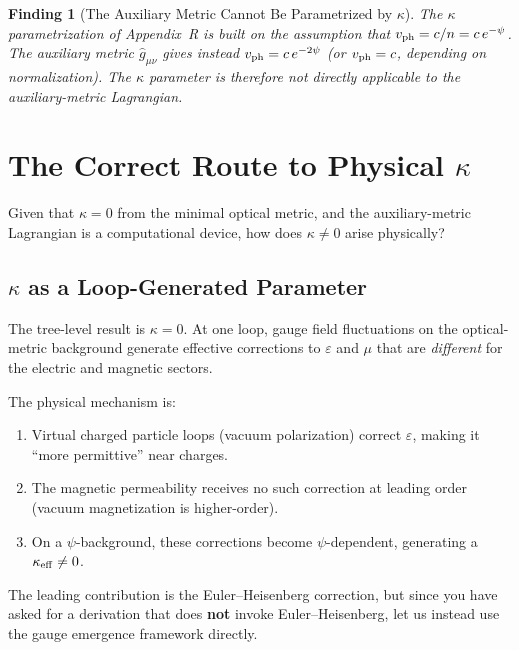 \documentclass[11pt,a4paper]{article}
\newtheorem{finding}{Finding}
\theoremstyle{definition}
\theoremstyle{remark}
\begin{document}
\begin{finding}[The Auxiliary Metric Cannot Be Parametrized by $\kappa$]
The $\kappa$ parametrization of Appendix~R is built on the assumption
that $v_{\rm ph} = c/n = c\,e^{-\psi}$.  The auxiliary metric
$\hat{g}_{\mu\nu}$ gives instead $v_{\rm ph} = c\,e^{-2\psi}$ (or
$v_{\rm ph} = c$, depending on normalization).  The $\kappa$ parameter
is therefore not directly applicable to the auxiliary-metric Lagrangian.
\end{finding}

\section{The Correct Route to Physical $\kappa$}

Given that $\kappa = 0$ from the minimal optical metric, and the
auxiliary-metric Lagrangian is a computational device, how does
$\kappa \neq 0$ arise physically?

\subsection{$\kappa$ as a Loop-Generated Parameter}

The tree-level result is $\kappa = 0$.  At one loop, gauge field
fluctuations on the optical-metric background generate effective
corrections to $\varepsilon$ and $\mu$ that are \textit{different}
for the electric and magnetic sectors.

The physical mechanism is:
\begin{enumerate}
\item Virtual charged particle loops (vacuum polarization) correct
$\varepsilon$, making it ``more permittive'' near charges.
\item The magnetic permeability receives no such correction at leading
order (vacuum magnetization is higher-order).
\item On a $\psi$-background, these corrections become $\psi$-dependent,
generating a $\kappa_{\rm eff} \neq 0$.
\end{enumerate}

The leading contribution is the Euler--Heisenberg correction, but
since you have asked for a derivation that does \textbf{not} invoke
Euler--Heisenberg, let us instead use the gauge emergence framework
directly.
\end{document}
